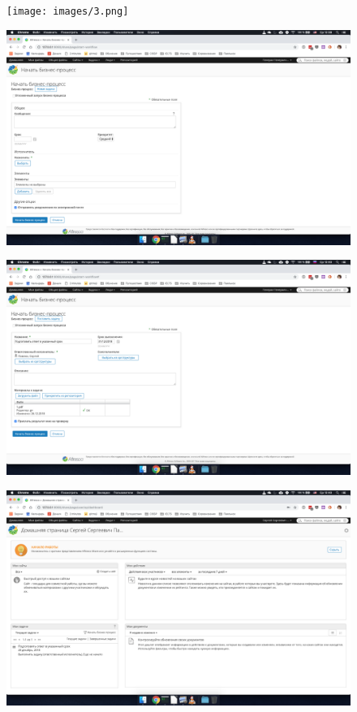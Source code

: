 \begin{figure}[H]
	\centering
	\texttt{[image: images/3.png]}
\end{figure}

\begin{figure}[H]
	\centering
	\includegraphics[width=.8\textwidth]{images/4.png}
\end{figure}

\begin{figure}[H]
	\centering
	\includegraphics[width=.8\textwidth]{images/5.png}
\end{figure}

\begin{figure}[H]
	\centering
	\includegraphics[width=.8\textwidth]{images/6.png}
\end{figure}

